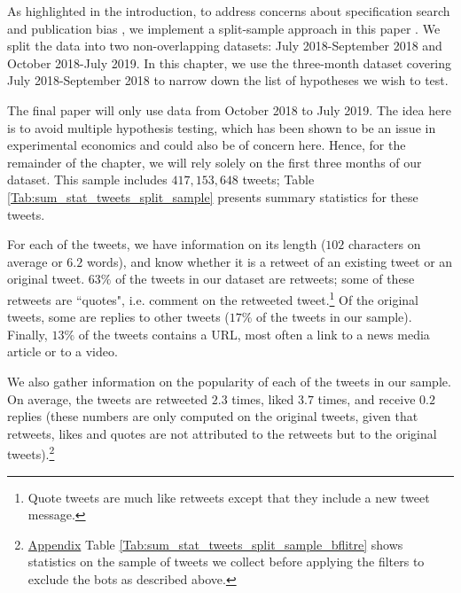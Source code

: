
As highlighted in the introduction, to address concerns about specification search and publication bias \citep{Leamer1978,Leamer1983,Glaeser2006_incentives}, we implement a split-sample approach in this paper \citep{FafchampsLabonne2016,FafchampsLabonne2017,AndersonMagruder2017}. We split the data into two non-overlapping datasets: July 2018-September 2018 and October 2018-July 2019. In this chapter, we use the three-month dataset covering July 2018-September 2018 to narrow down the list of hypotheses we wish to test.

The final paper will only use data from October 2018 to July 2019. The idea here is to avoid multiple hypothesis testing, which has been shown to be an issue in experimental economics \citep{ListShaikhXu2019} and could also be of concern here. Hence, for the remainder of the chapter, we will rely solely on the first three months of our dataset. This sample includes $417,153,648$ tweets; Table \ref{Tab:sum_stat_tweets_split_sample} presents summary statistics for these tweets. 

For each of the tweets, we have information on its length ($102$ characters on average or $6.2$ words), and know whether it is a retweet of an existing tweet or an original tweet. $63\%$ of the tweets in our dataset are retweets; some of these retweets are ``quotes", i.e. comment on the retweeted tweet.\footnote{Quote tweets are much like retweets except that they include a new tweet message.} Of the original tweets, some are replies to other tweets ($17\%$ of the tweets in our sample). Finally, $13\%$ of the tweets contains a URL, most often a link to a news media article or to a video.

We also gather information on the popularity of each of the tweets in our sample. On average, the tweets are retweeted $2.3$ times, liked $3.7$ times, and receive $0.2$ replies (these numbers are only computed on the original tweets, given that retweets, likes and quotes are not attributed to the retweets but to the original tweets).\footnote{\hyperlink{ref:Appendix}{Appendix} Table \ref{Tab:sum_stat_tweets_split_sample_bflitre} shows statistics on the sample of tweets we collect before applying the filters to exclude the bots as described above.} 


